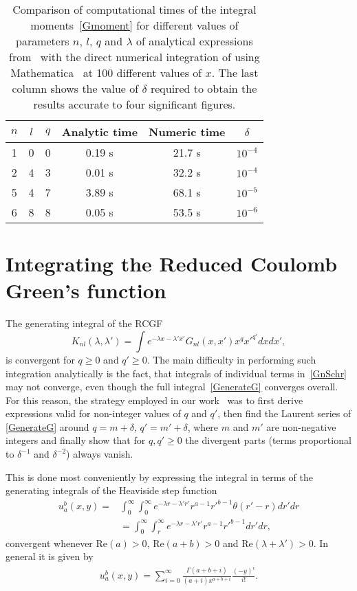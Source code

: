 \begin{table}[b]
       \centering
    \begin{tabular}{ccc|ccc}
         $n$ & $l$ & $q$ & Analytic time & Numeric time & $\delta$\\
        \hline
        \hline
    1 & 0 & 0 & 0.19 s & 21.7 s & $10^{-4}$ \\
    2 & 4 & 3 & 0.01 s & 32.2 s & $10^{-4}$ \\
    5 & 4 & 7 &  3.89 s & 68.1 s & $10^{-5}$ \\
    6 & 8 & 8 &  0.05 s & 53.5 s & $10^{-6}$ \\
    \hline  \end{tabular}
  \caption{Comparison of computational times of the integral moments~\eqref{Gmoment}
    for different values of parameters $n$, $l$, $q$ and $\lambda$ of
    analytical expressions from~\cite{Dzikowski_2020} with the direct numerical integration of  using
    Mathematica~\cite{Mathematica} at 100 different values of $x$.
    The last column shows the value of $\delta$ required to obtain the
    results accurate to four significant figures.}\label{tab:2}
\end{table}

\section{Integrating the Reduced Coulomb Green's function}

The generating integral of the RCGF
\begin{equation}\label{GenerateG}
    K_{nl}(\lambda, \lambda') = \int e^{-\lambda x - \lambda' x'} G_{nl}(x,x')x^{q} x'^{q'} dx dx',
\end{equation}
is convergent for $q \geq 0$ and $q' \geq 0$. The main difficulty in performing such integration analytically is the fact, that integrals of individual terms in~\eqref{GnSchr} may not converge, even though the full integral~\eqref{GenerateG} converges overall. For this reason, the strategy
employed in our work~\cite{Dzikowski_2020} was to first derive expressions valid for
non-integer values of $q$ and $q'$, then find the Laurent series of
\eqref{GenerateG} around $q = m + \delta$,
$q' = m' + \delta$, where $m$ and $m'$ are non-negative integers and
finally show that for $q,q'\geq0$ the divergent parts (terms
proportional to $\delta^{-1}$ and $\delta^{-2}$) always vanish.

This is done most conveniently by expressing the integral in terms of the generating integrals of the Heaviside step function
\begin{align}
   u_{a}^{b}(x,y) =&\int_0^\infty \int_0^\infty e^{-\lambda r - \lambda' r'} r^{a-1}
  {r'}^{b-1} \theta(r'-r)dr' dr \nonumber
  \\
  &= \int_0^\infty \int_r^\infty e^{-\lambda r - \lambda' r'} r^{a-1}
  {r'}^{b-1} dr' dr,
\end{align}
convergent whenever $\text{Re}(a)>0$, $\text{Re}(a + b) >0$ and
$\text{Re}(\lambda + \lambda') > 0$. In general it is given by
\begin{align} 
  u_{a}^{b}(x,y) =
  \sum_{i=0}^\infty \frac{\Gamma(a+b+i)}{(a+i)x^{a+b+i}}
  \frac{(-y)^i}{i!}. \label{uGen}
\end{align}


